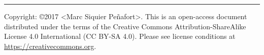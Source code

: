 \vfill
\vspace*{\fill}
\hrule
Copyright: \copyright  2017 <Marc Siquier Peñafort>. This is an open-access document distributed
under the terms of the Creative Commons Attribution-ShareAlike License 4.0 International (CC BY-SA 4.0). Please see license conditions at \url{https://creativecommons.org}.